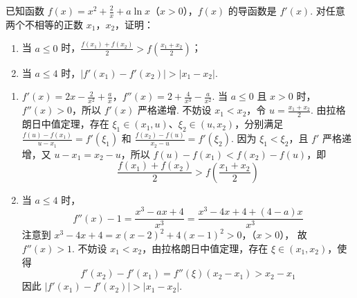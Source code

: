 \begin{problem}
已知函数 \(f(x)=x^2+\frac{2}{x}+a\ln x\)（\(x>0\)），\(f(x)\) 的导函数是 \(f'(x)\). 对任意两个不相等的正数 \(x_1\)，\(x_2\)，证明：

\begin{enumerate}
\item 当 \(a\leqslant 0\) 时，\(\frac{f(x_1)+f(x_2)}{2}>f\left(\frac{x_1+x_2}{2}\right)\)；
\item 当 \(a\leqslant 4\) 时，\(|f'(x_1)-f'(x_2)|>|x_1-x_2|\).
\end{enumerate}
\end{problem}

\begin{solution}
\begin{enumerate}
\item \(f'(x)=2x-\frac2{x^2}+\frac ax\)，\(f''(x)=2+\frac4{x^3}-\frac a{x^2}\). 当 \(a\leqslant0\) 且 \(x>0\) 时，\(f''(x)>0\)，所以 \(f'(x)\) 严格递增. 不妨设 \(x_1<x_2\)，令 \(u=\frac{x_1+x_2}{2}\). 由拉格朗日中值定理，存在 \(\xi_1\in(x_1,u)\)、\(\xi_2\in(u,x_2)\)，分别满足
\(\frac{f(u)-f(x_1)}{u-x_1}=f'(\xi_1)\) 和
\(\frac{f(x_2)-f(u)}{x_2-u}=f'(\xi_2)\).
因为 \(\xi_1<\xi_2\)，且 \(f'\) 严格递增，又 \(u-x_1=x_2-u\)，所以 \(f(u)-f(x_1)<f(x_2)-f(u)\)，即
\[
\frac{f(x_1)+f(x_2)}2>f\left(\frac{x_1+x_2}{2}\right)
\]
\item 当 \(a\leqslant4\) 时，
\[
f''(x)-1=\frac{x^3-ax+4}{x^3}=\frac{x^3-4x+4+(4-a)x}{x^3}
\]
注意到
\(x^3-4x+4=x(x-2)^2+4(x-1)^2>0\)，（\(x>0\)），
故 \(f''(x)>1\). 不妨设 \(x_1<x_2\)，由拉格朗日中值定理，存在 \(\xi\in(x_1,x_2)\)，使得
\[
f'(x_2)-f'(x_1)=f''(\xi)(x_2-x_1)>x_2-x_1
\]
因此 \(|f'(x_1)-f'(x_2)|>|x_1-x_2|\).
\end{enumerate}
\end{solution}
